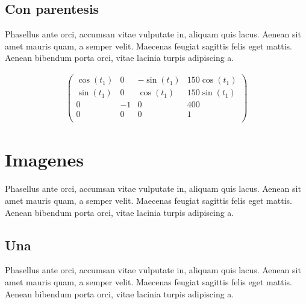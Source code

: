 \documentclass[colTwo]{NanouparIEEE}
\begin{document}
        \subsection{Con parentesis}
            Phasellus ante orci, accumsan vitae vulputate in, aliquam quis lacus. Aenean sit amet mauris quam, a semper velit. Maecenas feugiat sagittis felis eget mattis. Aenean bibendum porta orci, vitae lacinia turpis adipiscing a. 
            
            \begin{align}
                \begin{pmatrix}
                    \cos{(t_1)} & 0 & -\sin{(t_1)} & 150\cos{(t_1)}\\
                    \sin{(t_1)} & 0 & \cos{(t_1)} & 150\sin{(t_1)} \\
                    0 & -1 & 0 & 400 \\
                    0 & 0 & 0 & 1\\
                \end{pmatrix}
            \end{align}
    
    \section{Imagenes}
        Phasellus ante orci, accumsan vitae vulputate in, aliquam quis lacus. Aenean sit amet mauris quam, a semper velit. Maecenas feugiat sagittis felis eget mattis. Aenean bibendum porta orci, vitae lacinia turpis adipiscing a. 
        
        \subsection{Una}
            Phasellus ante orci, accumsan vitae vulputate in, aliquam quis lacus. Aenean sit amet mauris quam, a semper velit. Maecenas feugiat sagittis felis eget mattis. Aenean bibendum porta orci, vitae lacinia turpis adipiscing a. 
            
\end{document}
